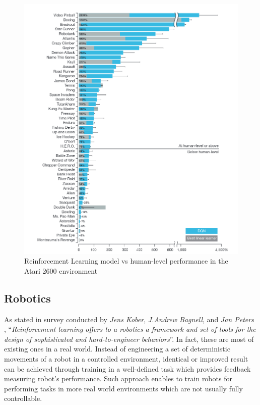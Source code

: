 \begin{figure}[h]
    \includegraphics[width=12cm]{img/Atari2600.png}
    \centering
    \caption{Reinforcement Learning model vs human-level performance in the Atari 2600 environment \cite{DQNAtari}}
    \label{fig:Atari2600}
\end{figure}

\subsection{Robotics}
\label{sub:intro-robotics}
As stated in survey conducted by \emph{Jens Kober}, \emph{J.Andrew Bagnell}, and \emph{Jan Peters} \cite{RNSurvey}, ``\emph{Reinforcement
learning offers to a robotics a framework and set of tools for the design of sophisticated and hard-to-engineer behaviors}''. In fact, these
are most of existing ones in a real world. Instead of engineering a set of deterministic movements of a robot in a controlled environment,
identical or improved result can be achieved through training in a well-defined task which provides feedback measuring robot's performance.
Such approach enables to train robots for performing tasks in more real world environments which are not usually fully controllable.

